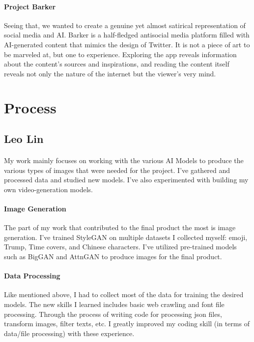 \documentclass[12pt, letterpaper]{article}
\begin{document}
\paragraph{Project Barker}Seeing that, we wanted to create a genuine yet almost satirical representation of social media and AI. Barker is a half-fledged antisocial media platform filled with AI-generated content that mimics the design of Twitter. It is not a piece of art to be marveled at, but one to experience. Exploring the app reveals information about the content’s sources and inspirations, and reading the content itself reveals not only the nature of the internet but the viewer's very mind.

\section{Process}

\subsection{Leo Lin}

\paragraph{}My work mainly focuses on working with the various AI Models to produce the various types of images that were needed for the project. I've gathered and processed data and studied new models. I've also experimented with building my own video-generation models.

\paragraph{Image Generation}The part of my work that contributed to the final product the most is image generation. I've trained StyleGAN on multiple datasets I collected myself: emoji, Trump, Time covers, and Chinese characters. I've utilized pre-trained models such as BigGAN and AttnGAN to produce images for the final product. 

\paragraph{Data Processing}Like mentioned above, I had to collect most of the data for training the desired models. The new skills I learned includes basic web crawling and font file processing. Through the process of writing code for processing json files, transform images, filter texts, etc. I greatly improved my coding skill (in terms of data/file processing) with these experience.
\end{document}
